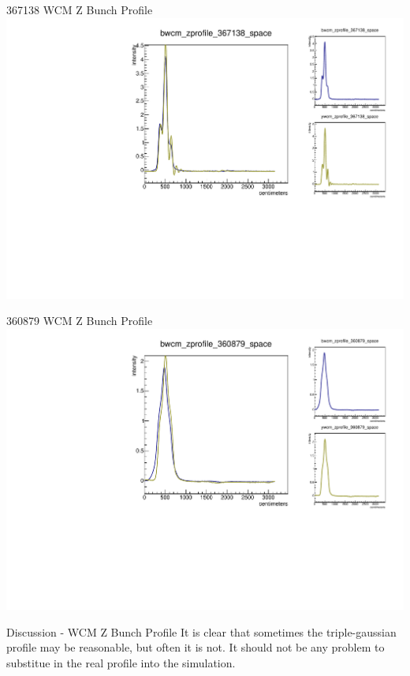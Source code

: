 \begin{frame}{367138 WCM Z Bunch Profile}
\includegraphics[width=\linewidth,height=\textheight,keepaspectratio]{../HourglassResults/figs/367138_wcm_zprofile.pdf}
\end{frame}

\begin{frame}{360879 WCM Z Bunch Profile}
\includegraphics[width=\linewidth,height=\textheight,keepaspectratio]{../HourglassResults/figs/360879_wcm_zprofile.pdf}
\end{frame}

\begin{frame} {Discussion - WCM Z Bunch Profile}
It is clear that sometimes the triple-gaussian profile may be reasonable, but
often it is not. It should not be any problem to substitue in the real profile
into the simulation.
\end{frame}

